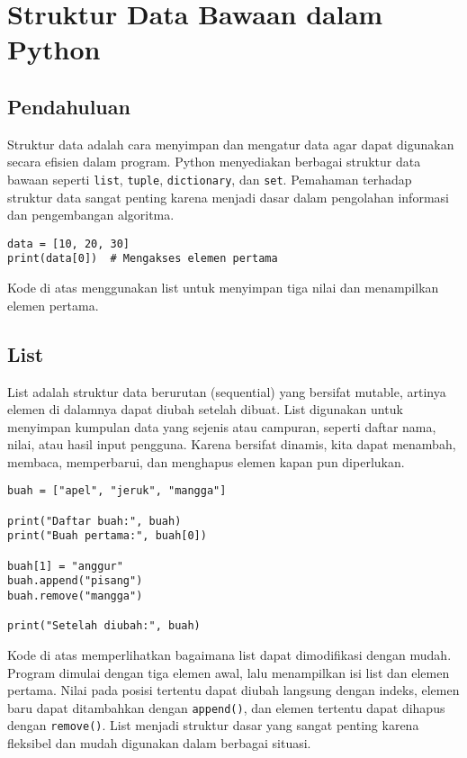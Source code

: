 \chapter{Struktur Data Bawaan dalam Python}

\section{Pendahuluan}
Struktur data adalah cara menyimpan dan mengatur data agar dapat digunakan secara efisien dalam program.
Python menyediakan berbagai struktur data bawaan seperti \texttt{list}, \texttt{tuple}, \texttt{dictionary}, dan \texttt{set}.
Pemahaman terhadap struktur data sangat penting karena menjadi dasar dalam pengolahan informasi dan pengembangan algoritma.

\begin{lstlisting}[style=PythonStyle]
data = [10, 20, 30]
print(data[0])  # Mengakses elemen pertama
\end{lstlisting}
Kode di atas menggunakan list untuk menyimpan tiga nilai dan menampilkan elemen pertama.

\section{List}
List adalah struktur data berurutan (sequential) yang bersifat mutable, artinya elemen di dalamnya dapat diubah setelah dibuat. 
List digunakan untuk menyimpan kumpulan data yang sejenis atau campuran, seperti daftar nama, nilai, atau hasil input pengguna. 
Karena bersifat dinamis, kita dapat menambah, membaca, memperbarui, dan menghapus elemen kapan pun diperlukan.

\begin{lstlisting}[style=PythonStyle]
buah = ["apel", "jeruk", "mangga"]

print("Daftar buah:", buah)
print("Buah pertama:", buah[0])

buah[1] = "anggur"
buah.append("pisang")
buah.remove("mangga")

print("Setelah diubah:", buah)
\end{lstlisting}

Kode di atas memperlihatkan bagaimana list dapat dimodifikasi dengan mudah. 
Program dimulai dengan tiga elemen awal, lalu menampilkan isi list dan elemen pertama. 
Nilai pada posisi tertentu dapat diubah langsung dengan indeks, elemen baru dapat ditambahkan dengan \texttt{append()}, 
dan elemen tertentu dapat dihapus dengan \texttt{remove()}. 
List menjadi struktur dasar yang sangat penting karena fleksibel dan mudah digunakan dalam berbagai situasi.


